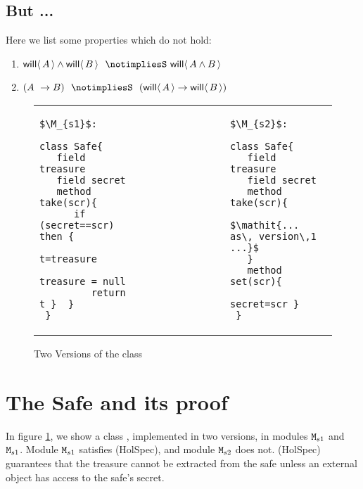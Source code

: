 \documentclass[acmsmall,screen,anonymous,review]{acmart}
\begin{document}
\subsection{But ... }
Here we list some properties which do not hold:
\begin{enumerate}
\item $\Future{A} \wedge \Future{B}\  \ \notimpliesS\ \Future{A\wedge B}$
\item  $(A \ \rightarrow B) \ \ \notimpliesS \ \   (\Future A \rightarrow \Future B)$
\end{enumerate}

\begin{figure}[htb]
 \begin{tabular}{lll} %
\begin{minipage}{0.45\textwidth}
\begin{lstlisting}
$\M_{s1}$:

class Safe{
   field treasure 
   field secret 
   method take(scr){
      if (secret==scr) then {
         t=treasure
         treasure = null
         return t }  }
 }
\end{lstlisting}
\end{minipage}
  &\ \ \  \ \ \ \ \  \ \ \ \ \ \ &
\begin{minipage}{0.45\textwidth}
\begin{lstlisting}
$\M_{s2}$:

class Safe{
   field treasure   
   field secret  
   method take(scr){
       $\mathit{... as\, version\,1 ...}$ 
   }
   method set(scr){
         secret=scr }
 }
\end{lstlisting}
\end{minipage} 
 \end{tabular}
  \vspace*{-0.95cm}
  \caption{Two Versions of the class }
 \label{fig:ExampleSafe}
 \vspace*{-0.65cm}
 \end{figure}


\section{The Safe and its proof}

In figure \ref{fig:ExampleSafe}, we show  a class  , implemented in two 
versions, in modules ${\mbox{\tt{\ensuremath{{\mbox{\tt{M}}}}}}}_{s1}$  and  ${\mbox{\tt{\ensuremath{{\mbox{\tt{M}}}}}}}_{s1}$. 
Module  ${\mbox{\tt{\ensuremath{{\mbox{\tt{M}}}}}}}_{s1}$   satisfies (HolSpec), and  module ${\mbox{\tt{\ensuremath{{\mbox{\tt{M}}}}}}}_{s2}$ does not. (HolSpec)
guarantees that the treasure cannot be extracted from the safe
unless  an external object has access to the safe's secret.
\end{document}
